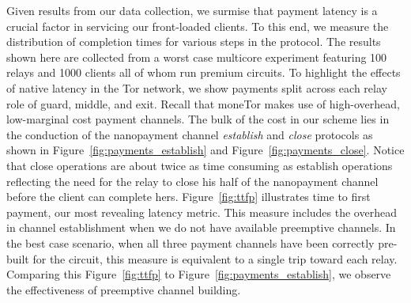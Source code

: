 Given results from our data collection, we surmise that payment latency is a
crucial factor in servicing our front-loaded clients. To this end, we measure
the distribution of completion times for various steps in the protocol. The
results shown here are collected from a worst case multicore experiment
featuring 100 relays and 1000 clients all of whom run premium circuits. To
highlight the effects of native latency in the Tor network, we show payments
split across each relay role of guard, middle, and exit. Recall that moneTor
makes use of high-overhead, low-marginal cost payment channels. The bulk of the
cost in our scheme lies in the conduction of the nanopayment channel
\emph{establish} and \emph{close} protocols as shown in
Figure~\ref{fig:payments_establish} and Figure~\ref{fig:payments_close}. Notice
that close operations are about twice as time consuming as establish operations
reflecting the need for the relay to close his half of the nanopayment channel
before the client can complete hers. Figure~\ref{fig:ttfp} illustrates time to
first payment, our most revealing latency metric. This measure includes the
overhead in channel establishment when we do not have available preemptive
channels. In the best case scenario, when all three payment channels have been
correctly pre-built for the circuit, this measure is equivalent to a single trip
toward each relay. Comparing this Figure~\ref{fig:ttfp} to
Figure~\ref{fig:payments_establish}, we observe the effectiveness of preemptive
channel building.

